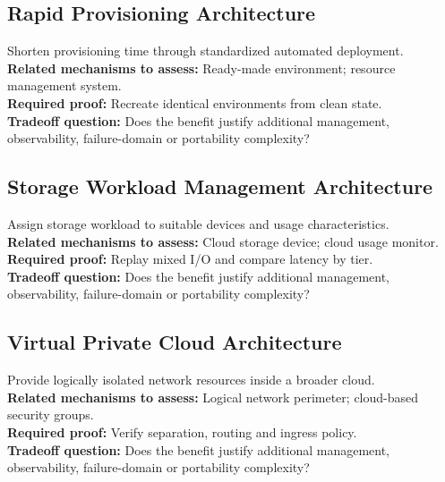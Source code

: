 \documentclass[10pt,letterpaper]{article}
\begin{document}
\subsection{Rapid Provisioning Architecture}
Shorten provisioning time through standardized automated deployment.\\[3pt]
\textbf{Related mechanisms to assess:} Ready-made environment; resource management system.\\[3pt]
\textbf{Required proof:} Recreate identical environments from clean state.\\[3pt]
\textbf{Tradeoff question:} Does the benefit justify additional management, observability, failure-domain or portability complexity?\\[3pt]
\subsection{Storage Workload Management Architecture}
Assign storage workload to suitable devices and usage characteristics.\\[3pt]
\textbf{Related mechanisms to assess:} Cloud storage device; cloud usage monitor.\\[3pt]
\textbf{Required proof:} Replay mixed I/O and compare latency by tier.\\[3pt]
\textbf{Tradeoff question:} Does the benefit justify additional management, observability, failure-domain or portability complexity?\\[3pt]
\subsection{Virtual Private Cloud Architecture}
Provide logically isolated network resources inside a broader cloud.\\[3pt]
\textbf{Related mechanisms to assess:} Logical network perimeter; cloud-based security groups.\\[3pt]
\textbf{Required proof:} Verify separation, routing and ingress policy.\\[3pt]
\textbf{Tradeoff question:} Does the benefit justify additional management, observability, failure-domain or portability complexity?\\[3pt]
\end{document}
